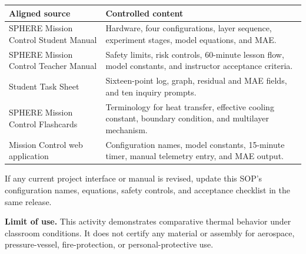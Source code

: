 \documentclass[11pt,a4paper]{article}
\newcommand{\note}[1]{\par\noindent{\color{amber}\textbf{NOTE - }}#1\par}
\begin{document}
\begin{tabularx}{\textwidth}{p{}Y}
\toprule
\textbf{Aligned source} & \textbf{Controlled content} \\
\midrule
SPHERE Mission Control Student Manual & Hardware, four configurations, layer sequence, experiment stages, model equations, and MAE. \\
SPHERE Mission Control Teacher Manual & Safety limits, risk controls, 60-minute lesson flow, model constants, and instructor acceptance criteria. \\
Student Task Sheet & Sixteen-point log, graph, residual and MAE fields, and ten inquiry prompts. \\
SPHERE Mission Control Flashcards & Terminology for heat transfer, effective cooling constant, boundary condition, and multilayer mechanism. \\
Mission Control web application & Configuration names, model constants, 15-minute timer, manual telemetry entry, and MAE output. \\
\bottomrule
\end{tabularx}

\note{If any current project interface or manual is revised, update this SOP's configuration names, equations, safety controls, and acceptance checklist in the same release.}

\small\textbf{Limit of use.} This activity demonstrates comparative thermal behavior under classroom conditions. It does not certify any material or assembly for aerospace, pressure-vessel, fire-protection, or personal-protective use.
\end{document}
